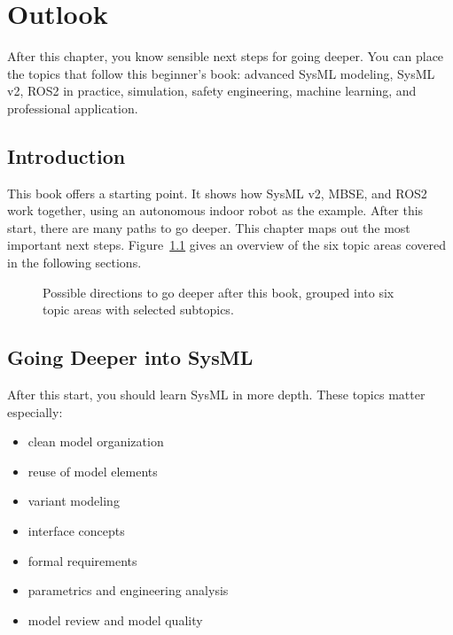 \chapter{Outlook}

\begin{lernziele}
After this chapter, you know sensible next steps for going deeper. You can place the topics that follow this beginner's book: advanced SysML modeling, SysML v2, ROS2 in practice, simulation, safety engineering, machine learning, and professional application.
\end{lernziele}

\section{Introduction}
This book offers a starting point. It shows how SysML v2, MBSE, and ROS2 work together, using an autonomous indoor robot as the example. After this start, there are many paths to go deeper. This chapter maps out the most important next steps. Figure~\ref{fig:kap22-vertiefungs-roadmap} gives an overview of the six topic areas covered in the following sections.

\begin{figure}[H]
  \centering
  \caption{Possible directions to go deeper after this book, grouped into six topic areas with selected subtopics.}
  \label{fig:kap22-vertiefungs-roadmap}
\end{figure}

\section{Going Deeper into SysML}
After this start, you should learn SysML in more depth. These topics matter especially:

\begin{itemize}
    \item clean model organization
    \item reuse of model elements
    \item variant modeling
    \item interface concepts
    \item formal requirements
    \item parametrics and engineering analysis
    \item model review and model quality
\end{itemize}

